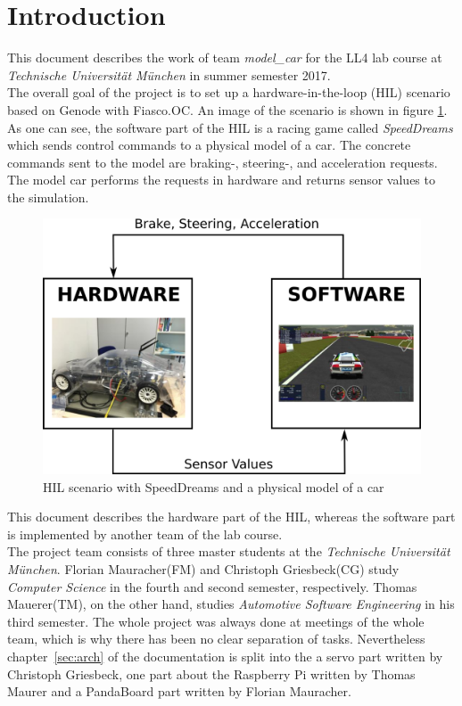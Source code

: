\section{Introduction}
\label{sec:intro}
This document describes the work of team \textit{model\_car} for the LL4 lab course at \textit{Technische Universität München} in summer semester 2017. \\

The overall goal of the project is to set up a hardware-in-the-loop (HIL) scenario based on Genode with Fiasco.OC. An image of the scenario is shown in figure \ref{fig:hil}. As one can see, the software part of the HIL is a racing game called \textit{SpeedDreams} which sends control commands to a physical model of a car. The concrete commands sent to the model are braking-, steering-, and acceleration requests. The model car performs the requests in hardware and returns sensor values to the simulation. \\

\begin{figure}[h]
    \centering
    \includegraphics[width=0.7\linewidth]{images/hil}
    \caption{HIL scenario with SpeedDreams and a physical model of a car}
    \label{fig:hil}
\end{figure}

This document describes the hardware part of the HIL, whereas the software part is implemented by another team of the lab course. \\

The project team consists of three master students at the \textit{Technische Universität München}. Florian Mauracher(FM) and Christoph Griesbeck(CG) study \textit{Computer Science} in the fourth and second semester, respectively. Thomas Mauerer(TM), on the other hand, studies \textit{Automotive Software Engineering} in his third semester. The whole project was always done at meetings of the whole team, which is why there has been no clear separation of tasks. Nevertheless chapter~\ref{sec:arch} of the documentation is split into the a servo part written by Christoph Griesbeck, one part about the Raspberry Pi written by Thomas Maurer and a PandaBoard part written by Florian Mauracher.
